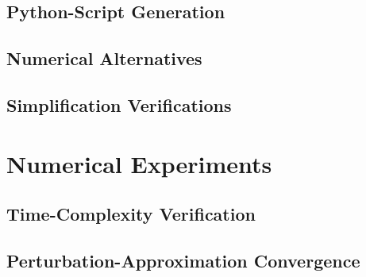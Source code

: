 \documentclass[
headings=optiontohead,              %
12pt,                               %
DIV=13,                             %
twoside=false,                      %
open=right,                         %
BCOR=00mm,                          %
toc=bibliographynumbered            %
]{scrreport}
\begin{document}
    \section{Python-Script Generation}

    \section{Numerical Alternatives}

    \section{Simplification Verifications}

\chapter{Numerical Experiments}
\label{sec:numerical-experiments}

\FloatBarrier

    \section{Time-Complexity Verification}

    \section{Perturbation-Approximation Convergence}

    \cite{variationalClassicalNetworksPaper}
    
\end{document}

